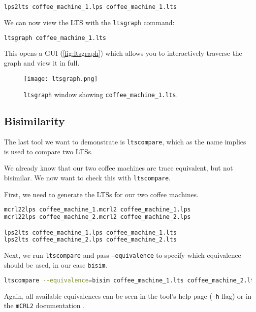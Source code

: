 \documentclass{clseminar}
\begin{document}
  \begin{lstlisting}[language=Bash]
lps2lts coffee_machine_1.lps coffee_machine_1.lts
  \end{lstlisting}

  We can now view the LTS with the \texttt{ltsgraph} command:

  \begin{lstlisting}[language=Bash]
ltsgraph coffee_machine_1.lts
  \end{lstlisting}

  This opens a GUI (\autoref{fig:ltsgraph}) which allows you to interactively traverse the graph and view it in full.

  \begin{figure}[!ht]
    \texttt{[image: ltsgraph.png]}
    \caption{\texttt{ltsgraph} window showing \texttt{coffee\_machine\_1.lts}.}
    \label{fig:ltsgraph}
  \end{figure}

  \subsection{Bisimilarity}

  The last tool we want to demonstrate is \texttt{ltscompare}, which as the name implies is used to compare two LTSs.

  We already know that our two coffee machines are trace equivalent, but not bisimilar. We now want to check this with \texttt{ltscompare}.

  First, we need to generate the LTSs for our two coffee machines.

  \begin{lstlisting}[language=Bash]
mcrl22lps coffee_machine_1.mcrl2 coffee_machine_1.lps
mcrl22lps coffee_machine_2.mcrl2 coffee_machine_2.lps

lps2lts coffee_machine_1.lps coffee_machine_1.lts
lps2lts coffee_machine_2.lps coffee_machine_2.lts
  \end{lstlisting}

  Next, we run \texttt{ltscompare} and pass \texttt{--equivalence} to specify which equivalence should be used, in our case \texttt{bisim}.

  \begin{lstlisting}[language=Bash]
ltscompare --equivalence=bisim coffee_machine_1.lts coffee_machine_2.lts
  \end{lstlisting}

  Again, all available equivalences can be seen in the tool's help page (\texttt{-h} flag) or in the \texttt{mCRL2} documentation \cite{mcrl2doc}.

  \newpage

  \appendix
\end{document}
